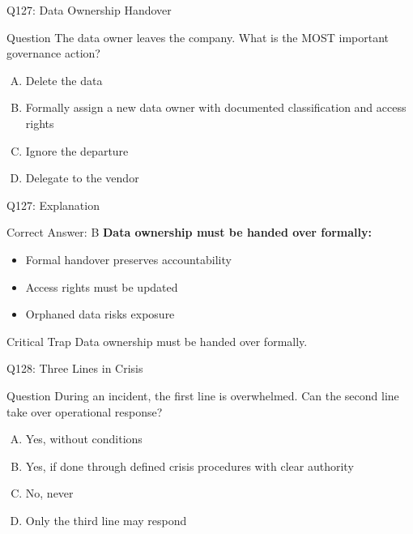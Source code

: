 \documentclass{beamer}
\begin{document}
	\begin{frame}{Q127: Data Ownership Handover}
		\begin{block}{Question}
			The data owner leaves the company. What is the MOST important governance action?
		\end{block}
		\begin{enumerate}[(A)]
			\item Delete the data
			\item Formally assign a new data owner with documented classification and access rights
			\item Ignore the departure
			\item Delegate to the vendor
		\end{enumerate}
	\end{frame}
	
	\begin{frame}{Q127: Explanation}
		\begin{block}{Correct Answer: B}
			\textbf{Data ownership must be handed over formally:}
			\begin{itemize}
				\item Formal handover preserves accountability
				\item Access rights must be updated
				\item Orphaned data risks exposure
			\end{itemize}
		\end{block}
		\begin{alertblock}{Critical Trap}
			Data ownership must be handed over formally.
		\end{alertblock}
	\end{frame}
	
	\begin{frame}{Q128: Three Lines in Crisis}
		\begin{block}{Question}
			During an incident, the first line is overwhelmed. Can the second line take over operational response?
		\end{block}
		\begin{enumerate}[(A)]
			\item Yes, without conditions
			\item Yes, if done through defined crisis procedures with clear authority
			\item No, never
			\item Only the third line may respond
		\end{enumerate}
	\end{frame}
	
\end{document}
